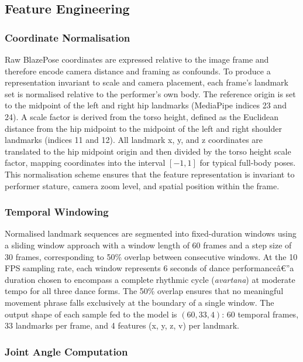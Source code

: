 \documentclass[journal]{IEEEtran}
\begin{document}
\subsection{Feature Engineering}

\subsubsection{Coordinate Normalisation}

Raw BlazePose coordinates are expressed relative to the image frame
and therefore encode camera distance and framing as confounds. To
produce a representation invariant to scale and camera placement, each
frame's landmark set is normalised relative to the performer's own body.
The reference origin is set to the midpoint of the left and right hip
landmarks (MediaPipe indices 23 and 24). A scale factor is derived from
the torso height, defined as the Euclidean distance from the hip
midpoint to the midpoint of the left and right shoulder landmarks
(indices 11 and 12). All landmark x, y, and z coordinates are
translated to the hip midpoint origin and then divided by the torso
height scale factor, mapping coordinates into the interval $[-1, 1]$
for typical full-body poses. This normalisation scheme ensures that
the feature representation is invariant to performer stature,
camera zoom level, and spatial position within the frame.

\subsubsection{Temporal Windowing}

Normalised landmark sequences are segmented into fixed-duration windows
using a sliding window approach with a window length of 60 frames and
a step size of 30 frames, corresponding to 50\% overlap between
consecutive windows. At the 10 FPS sampling rate, each window
represents 6 seconds of dance performanceâ€”a duration chosen to encompass
a complete rhythmic cycle (\textit{avartana}) at moderate tempo for all
three dance forms. The 50\% overlap ensures that no meaningful movement
phrase falls exclusively at the boundary of a single window. The output
shape of each sample fed to the model is $(60, 33, 4)$: 60 temporal
frames, 33 landmarks per frame, and 4 features (x, y, z, v) per
landmark.

\subsubsection{Joint Angle Computation}
\end{document}
